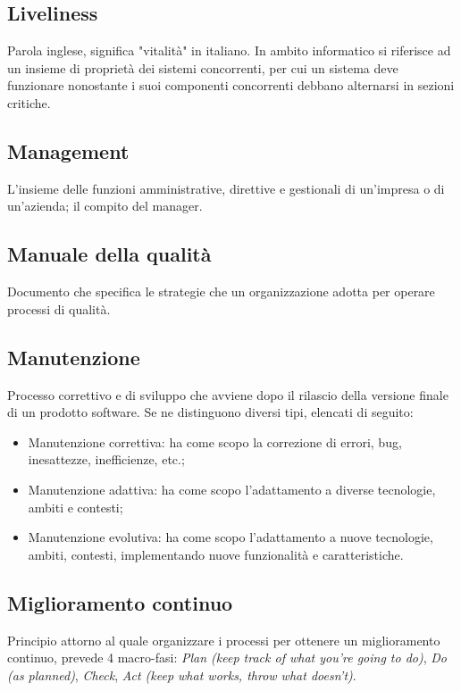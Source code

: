	
	\subsection{Liveliness}
	\label{sec:liveliness}
	Parola inglese, significa "vitalità" in italiano. In ambito informatico si riferisce ad un insieme di proprietà dei sistemi concorrenti, per cui un sistema deve funzionare nonostante i suoi componenti concorrenti debbano alternarsi in sezioni critiche.


	\newpage

	
	\subsection{Management}
	\label{sec:management}
	L'insieme delle funzioni amministrative, direttive e gestionali di un'impresa o di un'azienda; il compito del manager.

	
	\subsection{Manuale della qualità}
	\label{sec:manualequalita}
	Documento che specifica le strategie che un organizzazione adotta per operare processi di qualità.


	\subsection{Manutenzione}
	\label{sec:manutenzione}
	Processo correttivo e di sviluppo che avviene dopo il rilascio della versione finale di un prodotto software. Se ne distinguono diversi tipi, elencati di seguito:
	\begin{itemize}
		\item{Manutenzione correttiva: ha come scopo la correzione di errori, bug, inesattezze, inefficienze, etc.;}
		\item{Manutenzione adattiva: ha come scopo l'adattamento a diverse tecnologie, ambiti e contesti;}
		\item{Manutenzione evolutiva: ha come scopo l'adattamento a nuove tecnologie, ambiti, contesti, implementando nuove funzionalità e caratteristiche.}
	\end{itemize}

	
	\subsection{Miglioramento continuo}
	\label{sec:miglioramentocontinuo}
	Principio attorno al quale organizzare i processi per ottenere un miglioramento continuo, prevede 4 macro-fasi:
	\emph{Plan (keep track of what you're going to do)}, \emph{Do (as planned)}, \emph{Check}, \emph{Act (keep what works, throw what doesn't)}.

